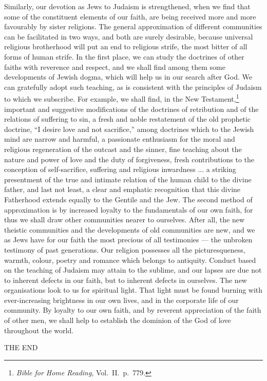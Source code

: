 Similarly, our devotion as Jews to Judaism
is strengthened, when we find that some of
the constituent elements of our faith, are
being received more and more favourably by
sister religions. The general approximation
of different communities can be facilitated in
two ways, and both are surely desirable,
because universal religious brotherhood will
put an end to religious strife, the most bitter
of all forms of human strife. In the first
place, we can study the doctrines of other
faiths with reverence and respect, and we
shall find among them some developments of
Jewish dogma, which will help us in our
search after God. We can gratefully adopt
such teaching, as is consistent with the
principles of Judaism to which we subscribe.
For example, we shall find, in the
New Testament,\footnote{\textsl{Bible
  for Home Reading}, Vol.\ II.\ p.\ 779.}
important and suggestive
modifications of the doctrines of retribution
and of the relations of suffering to sin, a fresh
and noble restatement of the old prophetic
doctrine, “I desire love and not sacrifice,”
among doctrines which to the Jewish mind are
narrow and harmful, a passionate enthusiasm
for the moral and religious regeneration of the
outcast and the sinner, fine teaching about the
nature and power of love and the duty of
forgiveness, fresh contributions to the
conception of self-sacrifice, suffering and religious
inwardness ... a striking presentment of the
true and intimate relation of the human child
to the divine father, and last not least, a
clear and emphatic recognition that this
divine Fatherhood extends equally to
the Gentile and the Jew. The second
method of approximation is by increased
loyalty to the fundamentals of our own faith,
for thus we shall draw other communities
nearer to ourselves. After all, the new
theistic communities and the developments
of old communities are new, and we as
Jews have for our faith the most precious of
all testimonies — the unbroken testimony of
past generations. Our religion possesses all
the picturesqueness, warmth, colour, poetry
and romance which belongs to antiquity.
Conduct based on the teaching of Judaism
may attain to the sublime, and our lapses are
due not to inherent defects in our faith,
but to inherent defects in ourselves. The
new organisations look to us for spiritual
light. That light must be found burning
with ever-increasing brightness in our own
lives, and in the corporate life of our community.
By loyalty to our own faith, and by
reverent appreciation of the faith of other
men, we shall help to establish the dominion
of the God of love throughout the world.

\vspace*{2\baselineskip}

{
  \centering\larger[2]
  THE END

}
